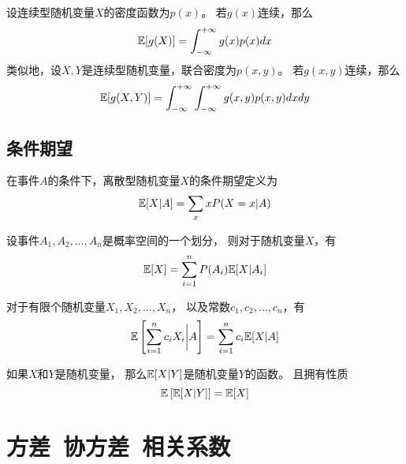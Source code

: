 \begin{theorem}
  设连续型随机变量$X$的密度函数为$p(x)$。
  若$g(x)$连续，那么
  \begin{displaymath}
    \mathbb{E}[g(X)] = \int_{-\infty}^{+\infty} g(x)p(x)dx
  \end{displaymath}
  类似地，设$X,Y$是连续型随机变量，联合密度为$p(x,y)$。
  若$g(x,y)$连续，那么
  \begin{displaymath}
    \mathbb{E}[g(X,Y)] = \int_{-\infty}^{+\infty}\int_{-\infty}^{+\infty} g(x,y)p(x,y)dxdy
  \end{displaymath}
\end{theorem}

\subsection{条件期望}
\begin{definition}[离散型随机变量的条件期望]
  在事件$A$的条件下，离散型随机变量$X$的条件期望定义为
  \begin{displaymath}
    \mathbb{E}[X|A] = \sum_{x} xP(X=x|A)
  \end{displaymath}
\end{definition}

\begin{theorem}[全期望公式]
  设事件$A_1,A_2,\dots,A_n$是概率空间的一个划分，
  则对于随机变量$X$，有
  \begin{displaymath}
    \mathbb{E}[X] = \sum_{i=1}^n P(A_i)\mathbb{E}[X|A_i]
  \end{displaymath}
\end{theorem}

\begin{theorem}[条件期望的线性性质]
  对于有限个随机变量$X_1,X_2,\dots,X_n$，
  以及常数$c_1,c_2,\dots,c_n$，有
  \begin{displaymath}
    \mathbb{E}\left[\sum_{i=1}^{n}c_iX_i\bigg|A\right] =
      \sum_{i=1}^{n}c_i\mathbb{E}[X|A]
  \end{displaymath}
\end{theorem}

\begin{theorem}[条件期望定义的随机变量]
  如果$X$和$Y$是随机变量，
  那么$\mathbb{E}[X|Y]$是随机变量$Y$的函数。
  且拥有性质
  \begin{displaymath}
    \mathbb{E}\left[\mathbb{E}[X|Y]\right] = \mathbb{E}[X]
  \end{displaymath}
\end{theorem}

\section{方差\ 协方差\ 相关系数}

